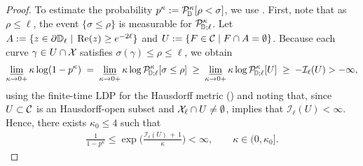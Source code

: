 \documentclass[a4paper, 11pt]{article}
\theoremstyle{definition}
\numberwithin{equation}{section}
\numberwithin{figure}{section}
\renewcommand{\liminf}{\varliminf}
\renewcommand\Re{\operatorname{Re}}
\newcommand{\renergy}[1][]{{\mathcal I}_{#1}}
\newcommand{\Dpaths}[1][]{\cX_{#1}}
\newcommand{\rDmeas}[1]{\mathcal{P}^{#1}_{\!\bD}}
\newcommand{\rDmeasure}[2][]{\mathcal{P}^{#2}_{\!\bD;#1}}
\newcommand{\cond}{\;|\;}
\begin{document}
\begin{proof}
To estimate the probability $p^{\kappa}:= \rDmeas{\kappa}[\rho < \sigma]$, we use . 
First, note that as $\rho \le \ell$, the event $\{\sigma \le \rho\}$ is measurable for $\rDmeasure[\ell]{\kappa}$.
Let $A := \{z \in \partial\bD_\ell \cond \Re(z) \ge e^{-2\ell}\}$ 
and $U := \{F \in \Dcompsets \cond F \cap A = \emptyset\}$.
Because each curve $\gamma \in U \cap \Dpaths$ satisfies $\sigma(\gamma) \le \rho \le \ell$, we obtain
\begin{align*}
\liminf_{\kappa \to 0+} \kappa \log (1 - p^{\kappa})
\; = \; \liminf_{\kappa \to 0+} \kappa \log \rDmeasure[\ell]{\kappa}[\sigma \leq \rho] 
\; \ge \; \liminf_{\kappa \to 0+} \kappa \log \rDmeasure[\ell]{\kappa}[U] 
\; \ge \; - \renergy[\ell](U) > -\infty,
\end{align*}
using the finite-time LDP for the Hausdorff metric ()
and noting that, since $U \subset \mathcal{C}$ is an Hausdorff-open subset and $\Dpaths[\ell] \cap U \ne \emptyset$,
 implies that $\renergy[\ell](U) < \infty$. 
Hence, there exists $\kappa_0 \leq 4$ such that 
\begin{align}\label{eqn:p-kappa_estimate}
\frac{1}{1-p^\kappa} \le \exp \Big(\tfrac{\renergy[\ell](U) \, + \, 1}{\kappa} \Big) < \infty, \qquad \kappa \in (0,\kappa_0].
\end{align}


\end{proof}
\end{document}
